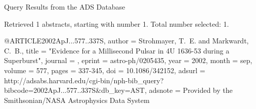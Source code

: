 Query Results from the ADS Database


Retrieved 1 abstracts, starting with number 1.  Total number selected: 1.

@ARTICLE{2002ApJ...577..337S,
   author = {{Strohmayer}, T.~E. and {Markwardt}, C.~B.},
    title = "{Evidence for a Millisecond Pulsar in 4U 1636-53 during a Superburst}",
  journal = {\apj},
   eprint = {astro-ph/0205435},
     year = 2002,
    month = sep,
   volume = 577,
    pages = {337-345},
      doi = {10.1086/342152},
   adsurl = {http://adsabs.harvard.edu/cgi-bin/nph-bib_query?bibcode=2002ApJ...577..337S&db_key=AST},
  adsnote = {Provided by the Smithsonian/NASA Astrophysics Data System}
}


